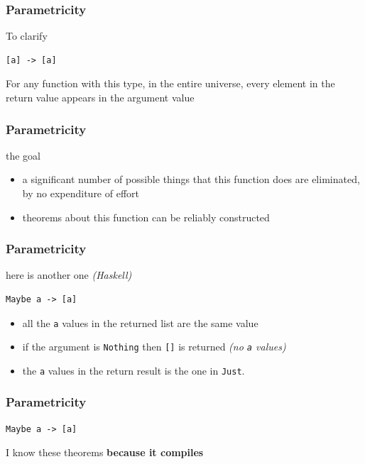 \begin{frame}[fragile]
\frametitle{Parametricity}
\begin{block}{To clarify}
\begin{lstlisting}
[a] -> [a]
\end{lstlisting}
\end{block}
For any function with this type, in the entire universe, every element in the return value appears in the argument value
\end{frame}

\begin{frame}[fragile]
\frametitle{Parametricity}
\begin{block}{the goal}
\begin{itemize}
  \item<1-> a significant number of possible things that this function does are eliminated, by no expenditure of effort
  \item<2-> theorems about this function can be reliably constructed
\end{itemize}
\end{block}
\end{frame}

\begin{frame}[fragile]
\frametitle{Parametricity}
\begin{block}{here is another one \emph{(Haskell)}}
\begin{lstlisting}
Maybe a -> [a]
\end{lstlisting}
\end{block}
\begin{itemize}
  \item<1-> all the \lstinline{a} values in the returned list are the same value
  \item<2-> if the argument is \lstinline{Nothing} then \lstinline{[]} is returned \emph{(no \lstinline{a} values)}
  \item<3-> the \lstinline{a} values in the return result is the one in \lstinline{Just}.
\end{itemize}
\end{frame}

\begin{frame}[fragile]
\frametitle{Parametricity}
\begin{center}
\begin{lstlisting}
Maybe a -> [a]
\end{lstlisting}
\end{center}
\begin{block}{I know these theorems}
\textbf{because it compiles}
\end{block}
\end{frame}

